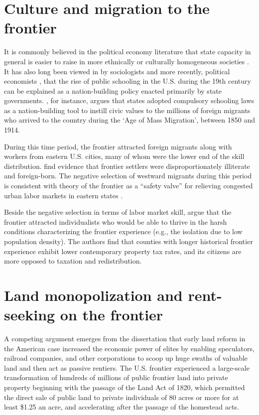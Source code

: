 \section{Culture and migration to the frontier}

It is commonly believed in the political economy literature that state capacity in general is easier to raise in more ethnically or culturally homogeneous societies \citep{besley2010state}. It has also long been viewed in by sociologists \citep{meyer1979public} and more recently, political economists \citep{alesina2013nation,bandiera2018nation}, that the rise of public schooling in the U.S. during the 19th century can be explained as a nation-building policy enacted primarily by state governments. \citet{bandiera2018nation}, for instance, argues that states adopted compulsory schooling laws as a nation-building tool to instill civic values to the millions of foreign migrants who arrived to the country during the `Age of Mass Migration', between 1850 and 1914. 

During this time period, the frontier attracted foreign migrants along with workers from eastern U.S. cities, many of whom were the lower end of the skill distribution. \citet{bazzi2017frontier} find evidence that frontier settlers were disproportionately illiterate and foreign-born. The negative selection of westward migrants during this period is consistent with theory of the frontier as a ``safety valve'' for relieving congested urban labor markets in eastern states \citep{turner1956significance, ferrie1997migration}.

Beside the negative selection in terms of labor market skill, \citet{bazzi2017frontier} argue that the frontier attracted individualists who would be able to thrive in the harsh conditions characterizing the frontier experience (e.g., the isolation due to low population density). The authors find that counties with longer historical frontier experience exhibit lower contemporary property tax rates, and its citizens are more opposed to taxation and redistribution. 

\section{Land monopolization and rent-seeking on the frontier} 

A competing argument emerges from the dissertation that early land reform in the American case increased the economic power of elites by enabling speculators, railroad companies, and other corporations to scoop up huge swaths of valuable land and then act as passive rentiers.  The U.S. frontier experienced a large-scale transformation of hundreds of millions of public frontier land into private property beginning with the passage of the Land Act of 1820, which permitted the direct sale of public land to private individuals of 80 acres or more for at least \$1.25 an acre, and accelerating after the passage of the homestead acts. 

